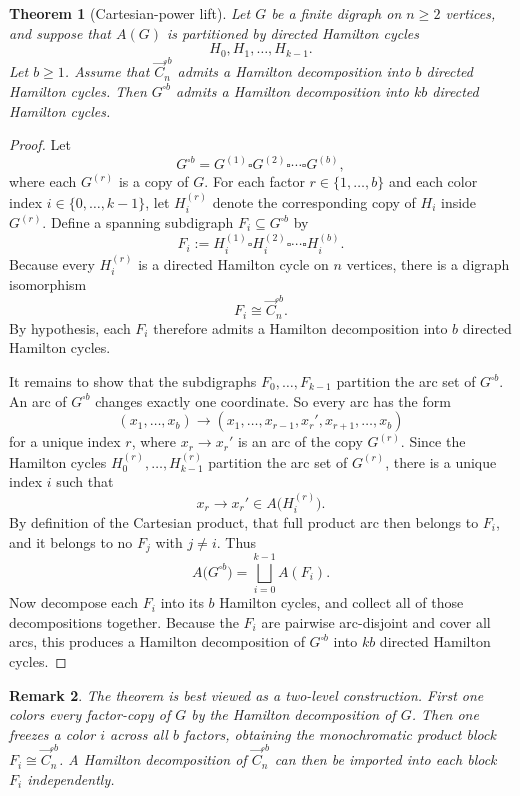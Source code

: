 \documentclass[11pt]{article}
\newtheorem{theorem}{Theorem}
\newtheorem{remark}[theorem]{Remark}
\newcommand{\Cdir}{\vec C}
\begin{document}
\begin{theorem}[Cartesian-power lift]\label{thm:power-lift}
Let $G$ be a finite digraph on $n\ge 2$ vertices, and suppose that $A(G)$ is
partitioned by directed Hamilton cycles
\[
H_0,H_1,\dots,H_{k-1}.
\]
Let $b\ge 1$.
Assume that $\Cdir_n^{\square b}$ admits a Hamilton decomposition into $b$
directed Hamilton cycles.
Then $G^{\square b}$ admits a Hamilton decomposition into $kb$ directed Hamilton
cycles.
\end{theorem}

\begin{proof}
Let
\[
G^{\square b}=G^{(1)}\square G^{(2)}\square\cdots\square G^{(b)},
\]
where each $G^{(r)}$ is a copy of $G$.
For each factor $r\in\{1,\dots,b\}$ and each color index
$i\in\{0,\dots,k-1\}$, let $H_i^{(r)}$ denote the corresponding copy of $H_i$
inside $G^{(r)}$.
Define a spanning subdigraph $F_i\subseteq G^{\square b}$ by
\[
F_i:=H_i^{(1)}\square H_i^{(2)}\square\cdots\square H_i^{(b)}.
\]
Because every $H_i^{(r)}$ is a directed Hamilton cycle on $n$ vertices,
there is a digraph isomorphism
\[
F_i\cong \Cdir_n^{\square b}.
\]
By hypothesis, each $F_i$ therefore admits a Hamilton decomposition into $b$
directed Hamilton cycles.

It remains to show that the subdigraphs $F_0,\dots,F_{k-1}$ partition the arc
set of $G^{\square b}$.
An arc of $G^{\square b}$ changes exactly one coordinate.
So every arc has the form
\[
(x_1,\dots,x_b)\to(x_1,\dots,x_{r-1},x_r',x_{r+1},\dots,x_b)
\]
for a unique index $r$, where $x_r\to x_r'$ is an arc of the copy $G^{(r)}$.
Since the Hamilton cycles $H_0^{(r)},\dots,H_{k-1}^{(r)}$ partition the arc set
of $G^{(r)}$, there is a unique index $i$ such that
\[
x_r\to x_r'\in A\bigl(H_i^{(r)}\bigr).
\]
By definition of the Cartesian product, that full product arc then belongs to
$F_i$, and it belongs to no $F_j$ with $j\neq i$.
Thus
\[
A\bigl(G^{\square b}\bigr)=\bigsqcup_{i=0}^{k-1} A(F_i).
\]
Now decompose each $F_i$ into its $b$ Hamilton cycles, and collect all of those
decompositions together.
Because the $F_i$ are pairwise arc-disjoint and cover all arcs, this produces a
Hamilton decomposition of $G^{\square b}$ into $kb$ directed Hamilton cycles.
\end{proof}

\begin{remark}
The theorem is best viewed as a two-level construction.
First one colors every factor-copy of $G$ by the Hamilton decomposition of $G$.
Then one freezes a color $i$ across all $b$ factors, obtaining the monochromatic
product block $F_i\cong \Cdir_n^{\square b}$.
A Hamilton decomposition of $\Cdir_n^{\square b}$ can then be imported into each
block $F_i$ independently.
\end{remark}
\end{document}
